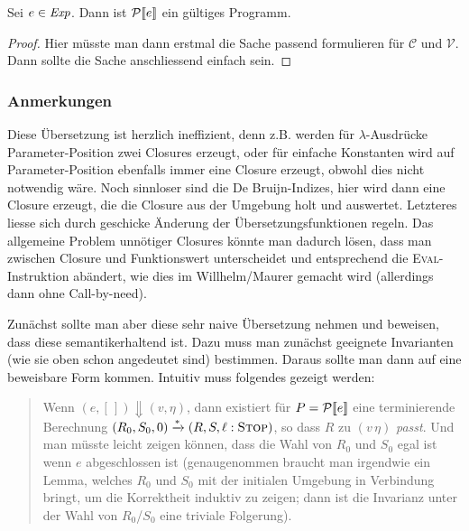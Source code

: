 \documentclass[12pt,fleqn,a4paper]{article}
\begin{document}
\begin{lemma}
  Sei $e\in{\text{\it Exp\/}}$. Dann ist $\mathcal{P}\llbracket e \rrbracket$ ein g\"ultiges Programm.
\end{lemma}

\begin{proof}
  Hier m\"usste man dann erstmal die Sache passend formulieren f\"ur $\mathcal{C}$ und $\mathcal{V}$. Dann
  sollte die Sache anschliessend einfach sein.
\end{proof}


\subsubsection{Anmerkungen}

Diese \"Ubersetzung ist herzlich ineffizient, denn z.B. werden f\"ur $\lambda$-Ausdr\"ucke Parameter-Position
zwei Closures erzeugt, oder f\"ur einfache Konstanten wird auf Parameter-Position ebenfalls immer eine Closure
erzeugt, obwohl dies nicht notwendig w\"are. Noch sinnloser sind die De Bruijn-Indizes, hier wird dann eine
Closure erzeugt, die die Closure aus der Umgebung holt und auswertet. Letzteres liesse sich durch geschicke
\"Anderung der \"Ubersetzungsfunktionen regeln. Das allgemeine Problem unn\"otiger Closures k\"onnte man dadurch
l\"osen, dass man zwischen Closure und Funktionswert unterscheidet und entsprechend die \textsc{Eval}-Instruktion
ab\"andert, wie dies im Willhelm/Maurer gemacht wird (allerdings dann ohne Call-by-need).

Zun\"achst sollte man aber diese sehr naive \"Ubersetzung nehmen und beweisen, dass diese semantikerhaltend ist. Dazu
muss man zun\"achst geeignete Invarianten (wie sie oben schon angedeutet sind) bestimmen. Daraus sollte man dann
auf eine beweisbare Form kommen. Intuitiv muss folgendes gezeigt werden:
\begin{quote}
  Wenn $(e,[\,]) \Downarrow (v,\eta)$, dann existiert f\"ur $P=\mathcal{P}\llbracket e \rrbracket$ eine terminierende Berechnung
  $(R_0,S_0,0) \xrightarrow* (R,S,\ell:\textsc{Stop})$, so dass $R$ zu $(v\,\eta)$ {\em passt}. Und
  man m\"usste leicht zeigen k\"onnen, dass die Wahl von $R_0$ und $S_0$ egal ist wenn $e$ abgeschlossen ist
  (genaugenommen braucht man irgendwie ein Lemma, welches $R_0$ und $S_0$ mit der initialen Umgebung in Verbindung
  bringt, um die
  Korrektheit induktiv zu zeigen; dann ist die Invarianz unter der Wahl von $R_0$/$S_0$ eine triviale Folgerung).
\end{quote}
\end{document}
